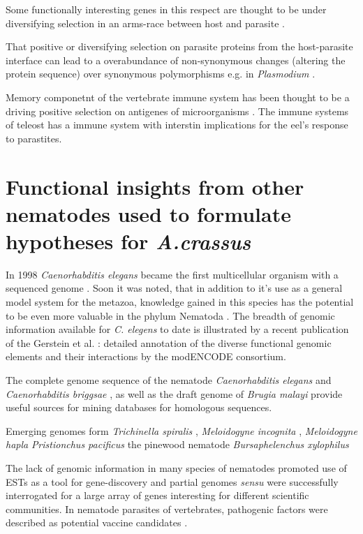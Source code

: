   Some functionally interesting genes in this respect are thought to
  be under diversifying selection in an arms-race between host and
  parasite \cite{zang_serine_2001}.

  That positive or diversifying selection on parasite proteins from
  the host-parasite interface can lead to a overabundance of
  non-synonymous changes (altering the protein sequence) over
  synonymous polymorphisms e.g. in \textit{Plasmodium}
  \cite{pmid7630387}.

  Memory componetnt of the vertebrate immune system has been thought
  to be a driving positive selection on antigenes of microorganisms
  \cite{conway_measuring_2002}. The immune systems of teleost has a
  immune system with interstin implications for the eel’s response to
  parastites.


\section{Functional insights from other nematodes used to formulate
  hypotheses for \textit{A.crassus}}
\label{func-ins}

In 1998 \textit{Caenorhabditis elegans} became the first multicellular
organism with a sequenced genome \cite{pmid9851916}. Soon it was
noted, that in addition to it's use as a general model system for the
metazoa, knowledge gained in this species has the potential to be even
more valuable in the phylum Nematoda
\cite{blaxter_caenorhabditis_1998}. The breadth of genomic information
available for \textit{C. elegens} to date is illustrated by a recent
publication of the Gerstein et al. \cite{pmid21177976}: detailed
annotation of the diverse functional genomic elements and their
interactions by the modENCODE consortium.

The complete genome sequence of the nematode \textit{Caenorhabditis
  elegans} \cite{pmid9851916} and \textit{Caenorhabditis briggsae}
\cite{stein_genome_2003}, as well as the draft genome of
\textit{Brugia malayi} \cite{ghedin_draft_2007} provide useful sources
for mining databases for homologous sequences.

Emerging genomes form \textit{Trichinella spiralis}
\cite{pmid21336279}, \textit{Meloidogyne incognita}
\cite{pmid18660804}, \textit{Meloidogyne hapla} \cite{pmid18809916}
\textit{Pristionchus pacificus} the pinewood nematode
\textit{Bursaphelenchus xylophilus} \cite{pmid21909270} 

The lack of genomic information in many species of nematodes promoted
use of ESTs as a tool for gene-discovery and partial genomes
\textit{sensu} \cite{parkinson_partigene--constructing_2004} were
successfully interrogated for a large array of genes interesting for
different scientific communities. In nematode parasites of
vertebrates, pathogenic factors were described as potential vaccine
candidates \cite{pmid11406138}.


